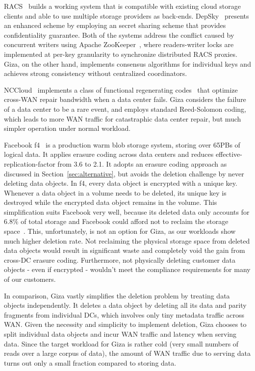 RACS~\cite{racs:socc10} builds a working system that is compatible with existing
cloud storage clients and able to use multiple storage providers as back-ends.
DepSky~\cite{depsky:eurosys11} presents an enhanced scheme by employing an
secret sharing scheme that provides confidentiality guarantee. Both of the
systems address the conflict caused by concurrent writers using Apache
ZooKeeper~\cite{zookeeper:atc10}, where readers-writer locks are implemented at
per-key granularity to synchronize distributed RACS proxies. Giza, on the other
hand, implements consensus algorithms for individual keys and achieves strong
consistency without centralized coordinators. 

NCCloud~\cite{nccloud:fast12} implements a class of functional regenerating
codes~\cite{dimakis07networkcoding} that optimize cross-WAN repair bandwidth
when a data center fails. Giza considers the failure of a data center to be a
rare event, and employs standard Reed-Solomon coding, which leads to more WAN
traffic for catastraphic data center repair, but much simpler operation under
normal workload.

Facebook f4~\cite{f4:osdi14} is a production warm blob storage system, storing
over 65PBs of logical data. It applies erasure coding across data centers and
reduces effective-replication-factor from 3.6 to 2.1. It adopts an erasure
coding approach as discussed in Section~\ref{sec:alternative}, but avoids the
deletion challenge by never deleting data objects. In f4, every data object is
encrypted with a unique key. Whenever a data object in a volume needs to be
deleted, its unique key is destroyed while the encrypted data object remains in
the volume. This simplification suits Facebook very well, because its deleted
data only accounts for $6.8\%$ of total storage and Facebook could afford not to
reclaim the storage space~\cite{f4:osdi14}. This, unfortunately, is not an
option for Giza, as our workloads show much higher deletion rate. Not reclaiming
the physical storage space from deleted data objects would result in significant
waste and completely void the gain from cross-DC erasure coding. Furthermore,
not physically deleting customer data objects - even if encrypted - wouldn't
meet the compliance requirements for many of our customers.

In comparison, Giza vastly simplifies the deletion problem by treating data
objects independently. It deletes a data object by deleting all its data and
parity fragments from individual DCs, which involves only tiny metadata traffic
across WAN. Given the necessity and simplicity to implement deletion, Giza
chooses to split individual data objects and incur WAN traffic and latency when
serving data. Since the target workload for Giza is rather cold (very small
numbers of reads over a large corpus of data), the amount of WAN traffic due to
serving data turns out only a small fraction compared to storing data.

